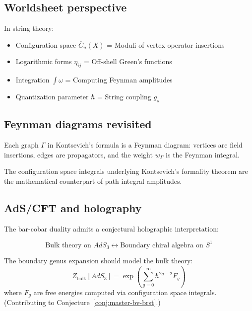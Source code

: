 \subsection{Worldsheet perspective}

In string theory:
\begin{itemize}
\item Configuration space $\overline{C}_n(X)$ = Moduli of vertex operator insertions
\item Logarithmic forms $\eta_{ij}$ = Off-shell Green's functions
\item Integration $\int \omega$ = Computing Feynman amplitudes
\item Quantization parameter $\hbar$ = String coupling $g_s$
\end{itemize}

\subsection{Feynman diagrams revisited}

Each graph $\Gamma$ in Kontsevich's formula is a Feynman diagram: vertices are field insertions, edges are propagators, and the weight $w_\Gamma$ is the Feynman integral.

The configuration space integrals underlying Kontsevich's formality theorem are the mathematical counterpart of path integral amplitudes.

\subsection{AdS/CFT and holography}

The bar-cobar duality admits a conjectural holographic interpretation:

\begin{conjecture}\label{conj:deformation-holographic}
\[\text{Bulk theory on } AdS_3 \longleftrightarrow \text{Boundary chiral algebra on } S^1\]

The boundary genus expansion should model the bulk theory:
\[Z_{\text{bulk}}[AdS_3] = \exp\left(\sum_{g=0}^\infty \hbar^{2g-2} F_g\right)\]
where $F_g$ are free energies computed via configuration space integrals.
(Contributing to Conjecture~\ref{conj:master-bv-brst}.)
\end{conjecture}

